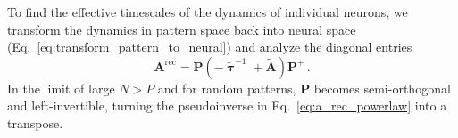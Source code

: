 To find the effective timescales of the dynamics of individual neurons, we transform the dynamics in pattern space back into neural space (Eq.~\ref{eq:transform_pattern_to_neural}) and analyze the diagonal entries
\begin{equation}\label{eq:a_rec_powerlaw}
    \mathbf{A}^{\text{rec}} = \mathbf{P} (-\tilde{\boldsymbol{\uptau}}^{-1} + \tilde{\mathbf{A}}) \mathbf{P}^{+} \,.
\end{equation}
%
%
%
In the limit of large $N > P$ and for random patterns, $\mathbf{P}$ becomes semi-orthogonal and left-invertible, turning the pseudoinverse in Eq.~\ref{eq:a_rec_powerlaw} into a transpose. 
%
%

